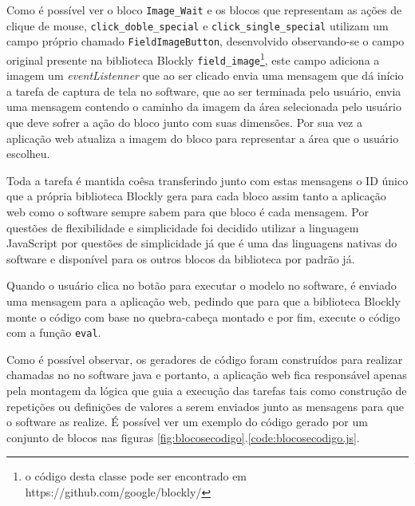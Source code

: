 \documentclass[tg]{mdtufsm}
\begin{document}
                    Como é possível ver o bloco \texttt{Image\_Wait} e os blocos que representam as ações de clique de mouse, \texttt{click\_doble\_special} e \texttt{click\_single\_special} utilizam um campo próprio chamado \texttt{FieldImageButton}, desenvolvido observando-se o campo original presente na biblioteca Blockly \texttt{field\_image}\footnote{o código desta classe pode ser encontrado em https://github.com/google/blockly/}, este campo adiciona a imagem um \emph{eventListenner} que ao ser clicado envia uma mensagem que dá início a tarefa de captura de tela no software, que ao ser terminada pelo usuário, envia uma mensagem contendo o caminho da imagem da área selecionada pelo usuário que deve sofrer a ação do bloco junto com suas dimensões. Por sua vez a aplicação web atualiza a imagem do bloco para representar a área que o usuário escolheu.

                    Toda a tarefa é mantida coêsa transferindo junto com estas mensagens o ID único que a própria biblioteca Blockly gera para cada bloco assim tanto a aplicação web como o software sempre sabem para que bloco é cada mensagem. Por questões de flexibilidade e simplicidade foi decidido utilizar a linguagem JavaScript por questões de simplicidade já que é uma das linguagens nativas do software e disponível para os outros blocos da biblioteca por padrão já.

                    Quando o usuário clica no botão para executar o modelo no software, é enviado uma mensagem para a aplicação web, pedindo que para que a biblioteca Blockly monte o código com base no quebra-cabeça montado e por fim, execute o código com a função \texttt{eval}.

                    Como é possível observar, os geradores de código foram construídos para realizar chamadas no no software java e portanto, a aplicação web fica responsável apenas pela montagem da lógica que guia a execução das tarefas tais como construção de repetições ou definições de valores a serem enviados junto as mensagens para que o software as realize. É possível ver um exemplo do código gerado por um conjunto de blocos nas figuras \ref{fig:blocosecodigo}.\ref{code:blocosecodigo.js}.
\end{document}

